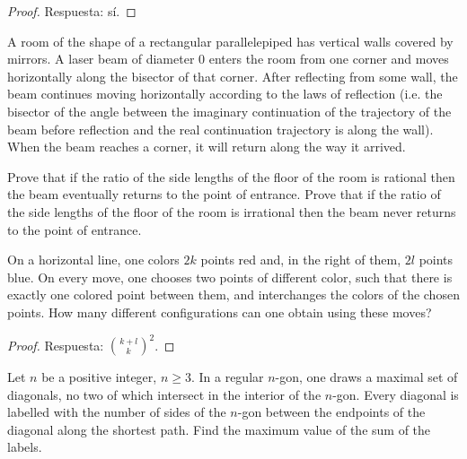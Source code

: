 \begin{proof}
  Respuesta: sí.
\end{proof}

\begin{probEG}[%
    Estonia National Olympiad 2020/10.1\protect\footnote{%
      Un video relacionado de
      \href{https://www.youtube.com/c/MatesMike}{Mates Mike}:
      \url{https://www.youtube.com/watch?v=5PAGXnPTE94}.%
    }%
  ]
  A room of the shape of a rectangular parallelepiped has vertical walls covered
  by mirrors. A laser beam of diameter $0$ enters the room from one corner and
  moves horizontally along the bisector of that corner. After reflecting from
  some wall, the beam continues moving horizontally according to the laws of
  reflection (i.e. the bisector of the angle between the imaginary continuation
  of the trajectory of the beam before reflection and the real continuation
  trajectory is along the wall). When the beam reaches a corner, it will return
  along the way it arrived.
  \begin{enumerate}[(a)]
    \ii Prove that if the ratio of the side lengths of the floor of the room is
    rational then the beam eventually returns to the point of entrance.
    \ii Prove that if the ratio of the side lengths of the floor of the room is
    irrational then the beam never returns to the point of entrance.
  \end{enumerate}
\end{probEG}

\begin{probEG}
  On a horizontal line, one colors $2k$ points red and, in the right of them,
  $2l$ points blue. On every move, one chooses two points of different color,
  such that there is exactly one colored point between them, and interchanges
  the colors of the chosen points. How many different configurations can one
  obtain using these moves?
\end{probEG}

\begin{proof}
  Respuesta: $\binom{k+l}{k}^2$.
\end{proof}

\begin{problem}
  Let $n$ be a positive integer, $n\ge 3$. In a regular $n$-gon, one draws a
  maximal set of diagonals, no two of which intersect in the interior of the
  $n$-gon. Every diagonal is labelled with the number of sides of the $n$-gon
  between the endpoints of the diagonal along the shortest path. Find the
  maximum value of the sum of the labels.
\end{problem}

